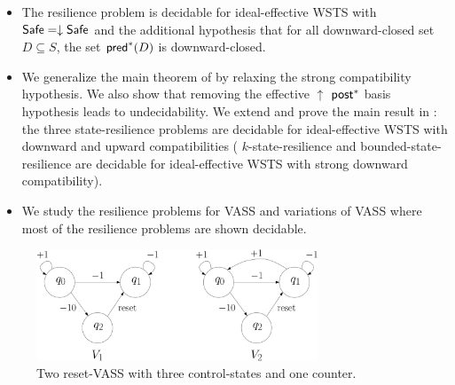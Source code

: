 \begin{itemize}
\item The resilience problem is decidable for ideal-effective WSTS with 
$\textsf{Safe}=\downarrow \textsf{Safe}$
and
the additional hypothesis that
for all downward-closed set $D \subseteq S$, the set $\textsf{pred}^*(D)$ is downward-closed.
%

\item We generalize the main theorem of \cite{DBLP:journals/corr/abs-2108-00889,DBLP:conf/gg/Ozkan22} by relaxing the strong compatibility hypothesis.
We also show that removing the effective 
$\uparrow$ $\textsf{post}^*$ basis hypothesis leads to undecidability. We extend and prove the main result in  \cite{DBLP:journals/corr/PrasadZ16} : the three state-resilience problems are decidable for ideal-effective WSTS with downward and upward compatibilities ({ $k$-state-resilience} and { bounded-state-resilience} are decidable for ideal-effective WSTS with strong downward compatibility).
%

\item We study the resilience problems for VASS and variations of VASS where most of the resilience problems are shown decidable.
\end{itemize}


 \begin{center}
	\begin{figure}
			\hspace{0.8cm}
\includegraphics[width=0.75\textwidth]{FigureCD}
	\caption{Two reset-VASS with three control-states and one counter.}
					\label{r-V}
	\end{figure}
\end{center}

